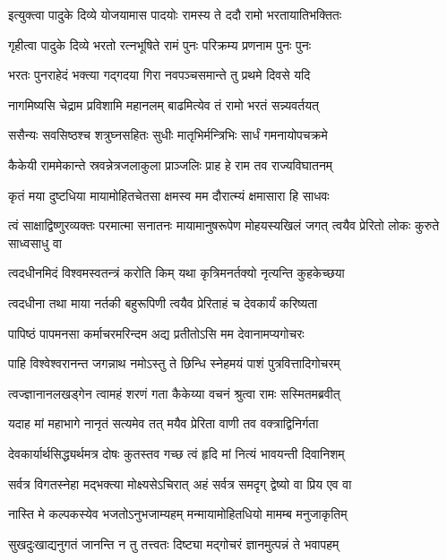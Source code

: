 \twolineshloka
{इत्युक्त्वा पादुके दिव्ये योजयामास पादयोः}
{रामस्य ते ददौ रामो भरतायातिभक्तितः} %

\twolineshloka
{गृहीत्वा पादुके दिव्ये भरतो रत्नभूषिते}
{रामं पुनः परिक्रम्य प्रणनाम पुनः पुनः} %

\twolineshloka
{भरतः पुनराहेदं भक्त्या गद्गदया गिरा}
{नवपञ्चसमान्ते तु प्रथमे दिवसे यदि} %

\twolineshloka
{नागमिष्यसि चेद्राम प्रविशामि महानलम्}
{बाढमित्येव तं रामो भरतं सन्न्यवर्तयत्} %

\twolineshloka
{ससैन्यः सवसिष्ठश्च शत्रुघ्नसहितः सुधीः}
{मातृभिर्मन्त्रिभिः सार्धं गमनायोपचक्रमे} %

\twolineshloka
{कैकेयी राममेकान्ते स्रवन्नेत्रजलाकुला}
{प्राञ्जलिः प्राह हे राम तव राज्यविघातनम्} %

\twolineshloka
{कृतं मया दुष्टधिया मायामोहितचेतसा}
{क्षमस्व मम दौरात्म्यं क्षमासारा हि साधवः} %

\threelineshloka
{त्वं साक्षाद्विष्णुरव्यक्तः परमात्मा सनातनः}
{मायामानुषरूपेण मोहयस्यखिलं जगत्}
{त्वयैव प्रेरितो लोकः कुरुते साध्वसाधु वा} %

\twolineshloka
{त्वदधीनमिदं विश्वमस्वतन्त्रं करोति किम्}
{यथा कृत्रिमनर्तक्यो नृत्यन्ति कुहकेच्छया} %

\twolineshloka
{त्वदधीना तथा माया नर्तकी बहुरूपिणी}
{त्वयैव प्रेरिताहं च देवकार्यं करिष्यता} %

\twolineshloka
{पापिष्ठं पापमनसा कर्माचरमरिन्दम}
{अद्य प्रतीतोऽसि मम देवानामप्यगोचरः} %

\twolineshloka
{पाहि विश्वेश्वरानन्त जगन्नाथ नमोऽस्तु ते}
{छिन्धि स्नेहमयं पाशं पुत्रवित्तादिगोचरम्} %

\twolineshloka
{त्वज्ज्ञानानलखड्गेन त्वामहं शरणं गता}
{कैकेय्या वचनं श्रुत्वा रामः सस्मितमब्रवीत्} %

\twolineshloka
{यदाह मां महाभागे नानृतं सत्यमेव तत्}
{मयैव प्रेरिता वाणी तव वक्त्राद्विनिर्गता} %

\twolineshloka
{देवकार्यार्थसिद्ध्यर्थमत्र दोषः कुतस्तव}
{गच्छ त्वं हृदि मां नित्यं भावयन्ती दिवानिशम्} %

\twolineshloka
{सर्वत्र विगतस्नेहा मद्भक्त्या मोक्ष्यसेऽचिरात्}
{अहं सर्वत्र समदृग् द्वेष्यो वा प्रिय एव वा} %

\twolineshloka
{नास्ति मे कल्पकस्येव भजतोऽनुभजाम्यहम्}
{मन्मायामोहितधियो मामम्ब मनुजाकृतिम्} %

\twolineshloka
{सुखदुःखाद्यनुगतं जानन्ति न तु तत्त्वतः}
{दिष्ट्या मद्गोचरं ज्ञानमुत्पन्नं ते भवापहम्} %

